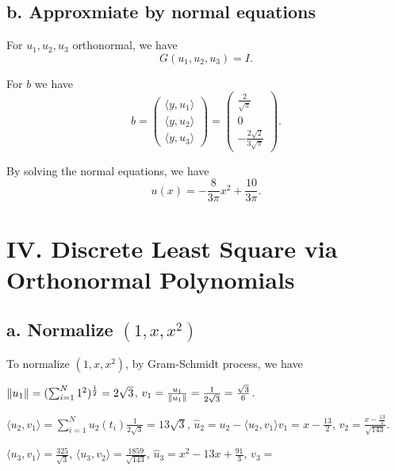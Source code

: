 \documentclass[a4paper]{article}
\begin{document}
\subsection*{b. Approxmiate by normal equations}

For $u_1, u_2, u_3$ orthonormal, we have
\begin{equation}
    G(u_1, u_2, u_3) = I. 
\end{equation}

For $b$ we have
\begin{equation}
    b = \begin{pmatrix} \langle y, u_1 \rangle \\ \langle y, u_2 \rangle \\ \langle y, u_3 \rangle \end{pmatrix} = \begin{pmatrix} \frac{2}{\sqrt{\pi}} \\ 0 \\ -\frac{2 \sqrt{2}}{3 \sqrt{\pi}} \end{pmatrix}.
\end{equation}

By solving the normal equations, we have
\begin{equation}
    u(x) = -\frac{8}{3 \pi} x^2 + \frac{10}{3 \pi}. 
\end{equation}


\section*{IV. Discrete Least Square via Orthonormal Polynomials}

\subsection*{a. Normalize $(1, x, x^2)$ }

To normalize $(1, x, x^2)$, by Gram-Schmidt process, we have

$\norm{u_1} = (\sum_{i=1}^{N} 1^2) ^{\frac{1}{2}} = 2 \sqrt{3}$, $v_1 = \frac{u_1}{\norm{u_1}} = \frac{1}{2 \sqrt{3}} = \frac{\sqrt{3}}{6}$.

$\langle u_2, v_1 \rangle = \sum_{i=1}^{N} u_2(t_i) \frac{1}{2 \sqrt{3}} = 13 \sqrt{3}$, $\hat{u}_2 = u_2 - \langle u_2, v_1 \rangle v_1 = x - \frac{13}{2}$, $v_2 = \frac{x - \frac{13}{2}}{\sqrt{143}}$. 

$\langle u_3, v_1 \rangle = \frac{325}{\sqrt{3}}$, $\langle u_3, v_2 \rangle = \frac{1859}{\sqrt{143}}$, $\hat{u}_3 = x^2 - 13 x + \frac{91}{3}$, $v_3 = $
\end{document}
